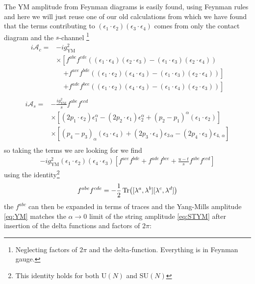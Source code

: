 \documentclass[a4paper,10pt]{article}
\renewcommand\[{\begin{equation*}}
\renewcommand\]{\end{equation*}}
\numberwithin{equation}{section}
\newcommand{\lp}{\left}
\newcommand{\rp}{\right}
\begin{document}
The YM amplitude from Feynman diagrams is easily found, using Feynman rules and here we will just reuse one of our old calculations from which we have found that the terms contributing to $(\epsilon_1\cdot\epsilon_2)(\epsilon_3\cdot\epsilon_4)$ comes from only the contact diagram and the $s$-channel \footnote{Neglecting factors of $2\pi$ and the delta-function. Everything is in Feynman gauge.}
\begin{align*}
	i\mathcal{A}_c=&-ig_{\text{YM}}^2\\
	&\times\lp[f^{abc}f^{cde}\lp((\epsilon_1\cdot \epsilon_4)(\epsilon_2\cdot\epsilon_3)-(\epsilon_1\cdot \epsilon_3)(\epsilon_2\cdot \epsilon_4)\rp)\rp.\\
	&\phantom{\times[}\lp.+f^{ace}f^{bde}\lp((\epsilon_1\cdot \epsilon_2)(\epsilon_4\cdot\epsilon_3)-(\epsilon_1\cdot \epsilon_3)(\epsilon_2\cdot \epsilon_4)\rp)\rp]\\
	&\phantom{\times[}\lp.+f^{ade}f^{bce}\lp((\epsilon_1\cdot \epsilon_2)(\epsilon_4\cdot\epsilon_3)-(\epsilon_1\cdot \epsilon_4)(\epsilon_2\cdot \epsilon_3)\rp)\rp]\\
\end{align*}
\begin{align*}
	i\mathcal{A}_s
	=&-\frac{ig_{\text{YM}}^2}{s}f^{abe}f^{ecd}\\
	&\times \lp[\lp(2p_1\cdot \epsilon_2\rp)\epsilon_1^\alpha - (2p_2\cdot \epsilon_1)\epsilon_2^\alpha+(p_2-p_1)^\alpha (\epsilon_1\cdot \epsilon_2)\rp]\\
	&\times\lp[(p_4-p_3)_\alpha (\epsilon_3\cdot\epsilon_4) + (2p_3\cdot \epsilon_4)\epsilon_{3\,\alpha}-(2p_4\cdot\epsilon_3)\epsilon_{4,\,\alpha}\rp]\\
\end{align*}
so taking the terms we are looking for we find 
\begin{equation} \label{eq:YM}
\begin{aligned}
-ig_{\text{YM}}^2(\epsilon_1\cdot \epsilon_2)(\epsilon_4\cdot\epsilon_3)\left[
f^{ace}f^{bde}+f^{ade}f^{bce}+\frac{u-t}{s}f^{abe}f^{ecd}\right]
\end{aligned}
\end{equation}
using the identity\footnote{This identity holds for both U$(N)$ and SU$(N)$}
\begin{equation}
	f^{abe}f^{cde}=-\frac{1}{2}\Tr([\lambda^a,\lambda^b][\lambda^c,\lambda^d])
\end{equation}
the $f^{abc}$ can then be expanded in terms of traces and the Yang-Mills amplitude \eqref{eq:YM} matches the $\alpha\to0$ limit of the string amplitude \eqref{eq:STYM} after insertion of the delta functions and factors of $2\pi$:
\end{document}
